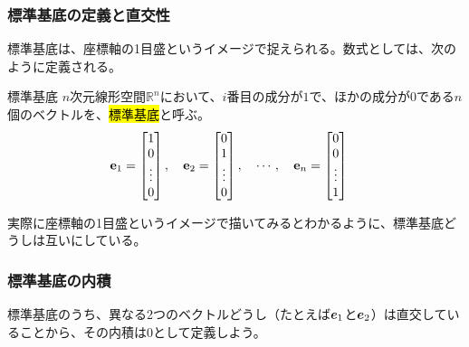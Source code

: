 \documentclass[../../imaging-math]{subfiles}
\begin{document}
\subsubsection{標準基底の定義と直交性}

標準基底は、座標軸の1目盛というイメージで捉えられる。数式としては、次のように定義される。

\begin{definition}{標準基底}
  \titlegap
  $n$次元線形空間$\mathbb{R}^n$において、$i$番目の成分が$1$で、ほかの成分が$0$である$n$個のベクトルを、\hl{標準基底}と呼ぶ。
  \large
  \begin{align*}
    \vb{e}_1 & = \begin{bmatrix}
                   1      \\
                   0      \\
                   \vdots \\
                   0
                 \end{bmatrix}, \quad
    \vb{e}_2 = \begin{bmatrix}
                 0      \\
                 1      \\
                 \vdots \\
                 0
               \end{bmatrix}, \quad
    \cdots, \quad
    \vb{e}_n = \begin{bmatrix}
                 0      \\
                 0      \\
                 \vdots \\
                 1
               \end{bmatrix}
  \end{align*}
\end{definition}

実際に座標軸の1目盛というイメージで描いてみるとわかるように、標準基底どうしは互いにしている。


\subsubsection{標準基底の内積}

標準基底のうち、異なる2つのベクトルどうし（たとえば$\vb*{e}_1$と$\vb*{e}_2$）は直交していることから、その内積は$0$として定義しよう。

\br
\end{document}
